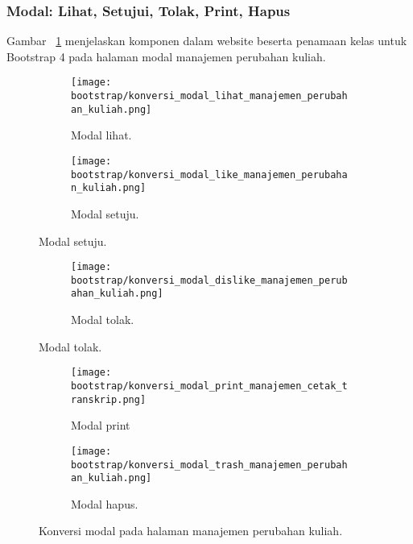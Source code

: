 \subsubsection{Modal: Lihat, Setujui, Tolak, Print, Hapus}

\noindent Gambar ~\ref{fig:konversiModalManajemenPerubahanKuliah} menjelaskan komponen dalam website beserta penamaan kelas untuk Bootstrap 4 pada halaman modal manajemen perubahan kuliah.\\
\begin{figure}[H]
	\centering
	\begin{subfigure}[b]{0.45\linewidth} 
		\texttt{[image: bootstrap/konversi\_modal\_lihat\_manajemen\_perubahan\_kuliah.png]}
		\caption{Modal lihat.}
	\end{subfigure}	
	\begin{subfigure}[b]{0.45\linewidth} 
		\texttt{[image: bootstrap/konversi\_modal\_like\_manajemen\_perubahan\_kuliah.png]}
		\caption{Modal setuju.}
	\end{subfigure}
\end{figure}
\begin{figure}[H]	
	\centering
	\ContinuedFloat
	\begin{subfigure}[b]{0.45\linewidth}  
		\texttt{[image: bootstrap/konversi\_modal\_dislike\_manajemen\_perubahan\_kuliah.png]}
		\caption{Modal tolak.}
	\end{subfigure}
\end{figure}

\begin{figure}[H] 
	\centering
	\ContinuedFloat
	\begin{subfigure}[b]{0.45\linewidth}  
		\texttt{[image: bootstrap/konversi\_modal\_print\_manajemen\_cetak\_transkrip.png]}
		\caption{Modal print}
	\end{subfigure}	
	\begin{subfigure}[b]{0.45\linewidth}   
		\texttt{[image: bootstrap/konversi\_modal\_trash\_manajemen\_perubahan\_kuliah.png]}
		\caption{Modal hapus.}
	\end{subfigure}
\caption{Konversi modal pada halaman manajemen perubahan kuliah.}
\label{fig:konversiModalManajemenPerubahanKuliah}
\end{figure}

